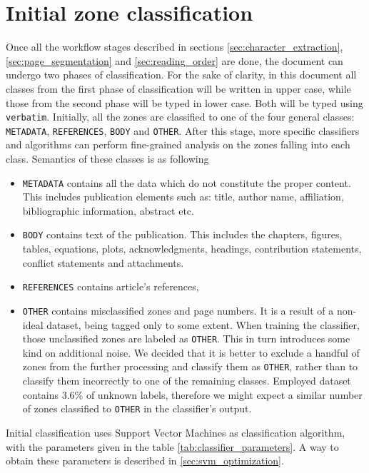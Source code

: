 \section{Initial zone classification}
Once all the workflow stages described in sections \ref{sec:character_extraction}, \ref{sec:page_segmentation} and \ref{sec:reading_order} are done, the document can undergo two phases of classification. For the sake of clarity, in this document all classes from the first phase of classification will be written in upper case, while those from the second phase will be typed in lower case. Both will be typed using \verb+verbatim+.
Initially, all the zones are classified to one of the four general classes: \verb+METADATA+, \verb+REFERENCES+, \verb+BODY+ and \verb+OTHER+. After this stage, more specific classifiers and algorithms can perform fine-grained analysis on the zones falling into each class. Semantics of these classes is as following
\begin{itemize}
\item \verb+METADATA+ contains all the data which do not constitute the proper content. This includes publication elements such as: title, author name, affiliation, bibliographic information, abstract etc.
\item \verb+BODY+ contains text of the publication. This includes the chapters, figures, tables, equations, plots, acknowledgments, headings, contribution statements, conflict statements and attachments.
\item \verb+REFERENCES+ contains article's references,
\item \verb+OTHER+ contains misclassified zones and page numbers. It is a result of a non-ideal dataset, being tagged only to some extent. When training the classifier, those unclassified zones are labeled as \verb+OTHER+. This in turn introduces some kind on additional noise. We decided that it is better to exclude a handful of zones from the further processing and classify them as \verb+OTHER+, rather than to classify them incorrectly to one of the remaining classes. Employed dataset contains 3.6\% of unknown labels, therefore we might expect a similar number of zones classified to \verb+OTHER+ in the classifier's output.
\end{itemize}
\quad
Initial classification uses Support Vector Machines as classification algorithm, with the parameters given in the table \ref{tab:classifier_parameters}. A way to obtain these parameters is described in \ref{sec:svm_optimization}.

